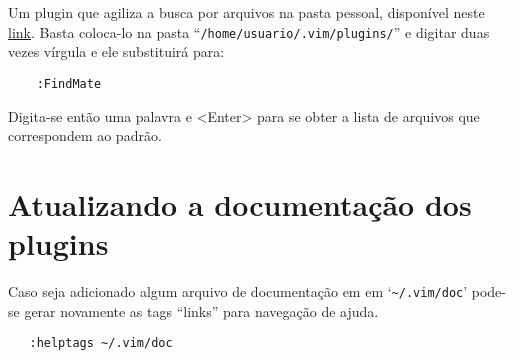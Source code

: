 Um plugin que agiliza a busca por arquivos na pasta pessoal, disponível neste
 \href{http://snipt.net/voyeg3r/findmate-plugin-for-vim/}{link}. Basta
coloca-lo na pasta ``{\tt /home/usuario/.vim/plugins/}'' e digitar duas vezes
vírgula e ele substituirá para:

\begin{verbatim}
    :FindMate 
\end{verbatim}

Digita-se então uma palavra e <Enter> para se obter a lista de arquivos que
correspondem ao padrão.

\section{Atualizando a documentação dos plugins}
\label{sec:Atualizando a documentação dos plugins}

Caso seja adicionado algum arquivo de documentação em em `\verb+~/.vim/doc+' pode-se
gerar novamente as tags ``links'' para navegação de ajuda.

\begin{verbatim}
   :helptags ~/.vim/doc
\end{verbatim}

